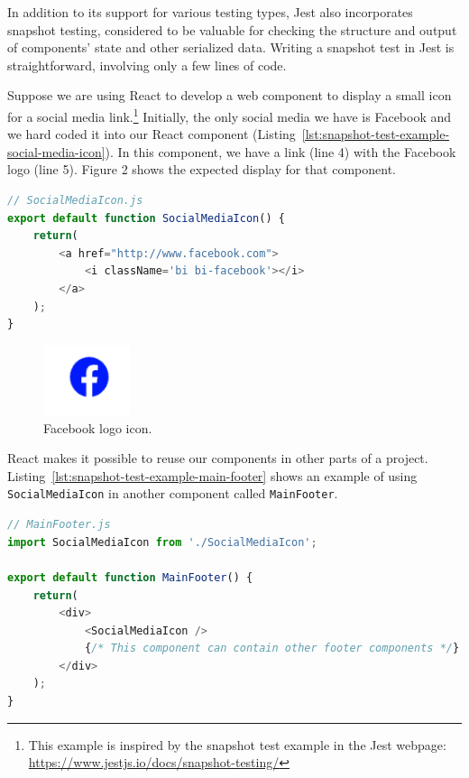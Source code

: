 \documentclass[
	msc, %
	english %
]{../ppgccufmg}
\begin{document}
    In addition to its support for various testing types, Jest also incorporates snapshot testing, considered to be valuable for checking the structure and output of components' state and other serialized data. Writing a snapshot test in Jest is straightforward, involving only a few lines of code.
    
    Suppose we are using React to develop a web component to display a small icon for a social media link.\footnote{This example is inspired by the snapshot test example in the Jest webpage: \url{https://www.jestjs.io/docs/snapshot-testing/}} Initially, the only social media we have is Facebook and we hard coded it into our React component (Listing~\ref{lst:snapshot-test-example-social-media-icon}). In this component, we have a link (line 4) with the Facebook logo (line 5). Figure 2 shows the expected display for that component.

    \begin{lstlisting}[language=javascript, caption= \texttt{SocialMediaIcon} React component, label=lst:snapshot-test-example-social-media-icon]
// SocialMediaIcon.js
export default function SocialMediaIcon() {
    return(
        <a href="http://www.facebook.com">
            <i className='bi bi-facebook'></i>
        </a>
    );
}
    \end{lstlisting}

    \begin{figure}[h]
        \centering
        \includegraphics[width=96px]{exemplo/img/facebook-logo.png}
        \caption{Facebook logo icon.}
        \label{fig:facebook-logo}
    \end{figure}

    React makes it possible to reuse our components in other parts of a project. Listing~\ref{lst:snapshot-test-example-main-footer} shows an example of using \texttt{SocialMediaIcon} in another component called \texttt{MainFooter}.

    \begin{lstlisting}[language=javascript, caption= (Re)using \texttt{SocialMediaIcon} in another component, label=lst:snapshot-test-example-main-footer]
// MainFooter.js
import SocialMediaIcon from './SocialMediaIcon';

export default function MainFooter() {
    return(
        <div>
            <SocialMediaIcon />
            {/* This component can contain other footer components */}
        </div>
    );
}
    \end{lstlisting}
\end{document}
